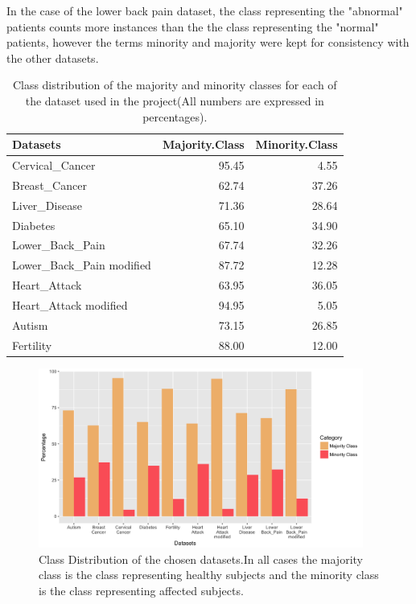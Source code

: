In the case of the lower back pain dataset, the class representing the "abnormal" patients counts more instances than the the class representing the "normal" patients, however the terms minority and majority were kept for consistency with the other datasets.\newline



\begin{table}[!htbp]
\centering
\begin{tabular}{lrr}
  \hline
  \rowcolor{LightCyan}
Datasets & Majority.Class & Minority.Class \\ 
  \hline
Cervical\_Cancer & 95.45 & 4.55 \\ 
  Breast\_Cancer & 62.74 & 37.26 \\ 
  Liver\_Disease & 71.36 & 28.64 \\ 
  Diabetes & 65.10 & 34.90 \\ 
  Lower\_Back\_Pain & 67.74 & 32.26 \\ 
  Lower\_Back\_Pain modified & 87.72 & 12.28 \\ 
  Heart\_Attack & 63.95 & 36.05 \\ 
  Heart\_Attack modified & 94.95 & 5.05 \\ 
  Autism & 73.15 & 26.85 \\ 
  Fertility & 88.00 & 12.00 \\ 
   \hline
\end{tabular}
\caption{Class distribution of the majority and minority classes for each of the dataset used in the project(All numbers are expressed in percentages).}
\label{tab:classDist}
\end{table}

\begin{figure}[!htbp]
    \centering
    \includegraphics[width=0.95\textwidth]{ThesisTemplate/usingLatex/chapter4Images/figure4_1b.png}
    \caption{Class Distribution of the chosen datasets.\newline In all cases the majority class is the class representing healthy subjects and the minority class is the class representing affected subjects.}
    \label{fig:classDistr}
\end{figure}




